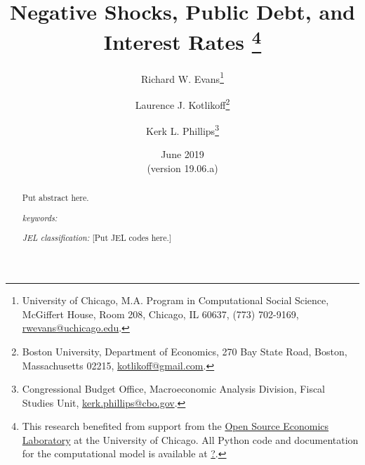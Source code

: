 \documentclass[letterpaper,12pt]{article}
\theoremstyle{definition}
\begin{document}
\begin{titlepage}
\title{Negative Shocks, Public Debt, and Interest Rates \thanks{This research benefited from support from the \href{https://www.oselab.org/}{Open Source Economics Laboratory} at the University of Chicago. All Python code and documentation for the computational model is available at \href{?}{?}.}
}
\author{
  Richard W. Evans\footnote{University of Chicago, M.A. Program in Computational Social Science, McGiffert House, Room 208, Chicago, IL 60637, (773) 702-9169, \href{mailto:rwevans@uchicago.edu}{rwevans@uchicago.edu}.}
  \and
  Laurence J. Kotlikoff\footnote{Boston University, Department of Economics, 270 Bay State Road, Boston, Massachusetts 02215, \href{mailto:kotlikoff@gmail.com}{kotlikoff@gmail.com}.}
  \and
  Kerk L. Phillips\footnote{Congressional Budget Office, Macroeconomic Analysis Division, Fiscal Studies Unit, \href{mailto:kerk.phillips@cbo.gov}{kerk.phillips@cbo.gov}.}}
\date{June 2019 \\
  \scriptsize{(version 19.06.a)}}
\maketitle
\vspace{-9mm}
\begin{abstract}
  Put abstract here.
  \vspace{3mm}

  \noindent\textit{keywords:}

  \vspace{3mm}

  \noindent\textit{JEL classification:} [Put JEL codes here.]

\end{abstract}
\thispagestyle{empty}
\end{titlepage}
\end{document}
